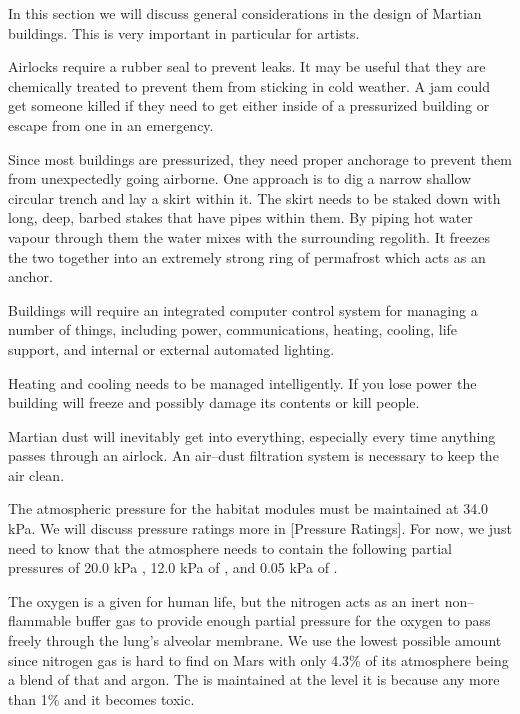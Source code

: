 

In this section we will discuss general considerations in the design of Martian buildings. This is very important in particular for artists.

Airlocks require a rubber seal to prevent leaks. It may be useful that they are chemically treated to prevent them from sticking in cold weather. A jam could get someone killed if they need to get either inside of a pressurized building or escape from one in an emergency.

Since most buildings are pressurized, they need proper anchorage to prevent them from unexpectedly going airborne. One approach is to dig a narrow shallow circular trench and lay a skirt within it. The skirt needs to be staked down with long, deep, barbed stakes that have pipes within them. By piping hot water vapour through them the water mixes with the surrounding regolith. It freezes the two together into an extremely strong ring of permafrost which acts as an anchor.

Buildings will require an integrated computer control system for managing a number of things, including power, communications, heating, cooling, life support, and internal or external automated lighting.

Heating and cooling needs to be managed intelligently. If you lose power the building will freeze and possibly damage its contents or kill people.

Martian dust will inevitably get into everything, especially every time anything passes through an airlock. An air--dust filtration system is necessary to keep the air clean.

The atmospheric pressure for the habitat modules must be maintained at 34.0 kPa. We will discuss pressure ratings more in [Pressure Ratings]. For now, we just need to know that the atmosphere needs to contain the following partial pressures of 20.0 kPa , 12.0 kPa of , and 0.05 kPa of .

The oxygen is a given for human life, but the nitrogen acts as an inert non--flammable buffer gas to provide enough partial pressure for the oxygen to pass freely through the lung's alveolar membrane. We use the lowest possible amount since nitrogen gas is hard to find on Mars with only 4.3\% of its atmosphere being a blend of that and argon. The  is maintained at the level it is because any more than 1\% and it becomes toxic.

